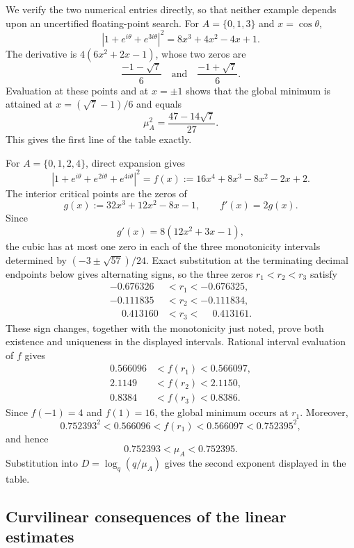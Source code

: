 \documentclass[12pt]{amsart}
\numberwithin{equation}{section}
\begin{document}
We verify the two numerical entries directly, so that neither example depends upon an uncertified floating-point search.  For $A=\{0,1,3\}$ and
$x=\cos\theta$,
\[
 |1+e^{i\theta}+e^{3i\theta}|^2
 =8x^3+4x^2-4x+1.
\]
The derivative is $4(6x^2+2x-1)$, whose two zeros are
\[
 \frac{-1-\sqrt7}{6}
 \quad\text{and}\quad
 \frac{-1+\sqrt7}{6}.
\]
Evaluation at these points and at $x=\pm1$ shows that the global minimum is
attained at $x=(\sqrt7-1)/6$ and equals
\[
 \mu_A^2=\frac{47-14\sqrt7}{27}.
\]
This gives the first line of the table exactly.

For $A=\{0,1,2,4\}$, direct expansion gives
\[
 |1+e^{i\theta}+e^{2i\theta}+e^{4i\theta}|^2
 =f(x):=16x^4+8x^3-8x^2-2x+2.
\]
The interior critical points are the zeros of
\[
 g(x):=32x^3+12x^2-8x-1,
 \qquad f'(x)=2g(x).
\]
Since
\[
 g'(x)=8(12x^2+3x-1),
\]
the cubic has at most one zero in each of the three monotonicity intervals
determined by $(-3\pm\sqrt{57})/24$.  Exact substitution at the terminating
decimal endpoints below gives alternating signs, so the three zeros
$r_1<r_2<r_3$ satisfy
\[
\begin{aligned}
 -0.676326&<r_1<-0.676325,\\
 -0.111835&<r_2<-0.111834,\\
 \phantom{-}0.413160&<r_3<\phantom{-}0.413161.
\end{aligned}
\]
These sign changes, together with the monotonicity just noted, prove both
existence and uniqueness in the displayed intervals.  Rational interval
evaluation of $f$ gives
\[
\begin{aligned}
 0.566096&<f(r_1)<0.566097,\\
 2.1149&<f(r_2)<2.1150,\\
 0.8384&<f(r_3)<0.8386.
\end{aligned}
\]
Since $f(-1)=4$ and $f(1)=16$, the global minimum occurs at $r_1$.
Moreover,
\[
 0.752393^2<0.566096<f(r_1)<0.566097<0.752395^2,
\]
and hence
\[
 0.752393<\mu_A<0.752395.
\]
Substitution into $D=\log_q(q/\mu_A)$ gives the second exponent displayed in
the table.

\subsection{Curvilinear consequences of the linear estimates}
\end{document}
